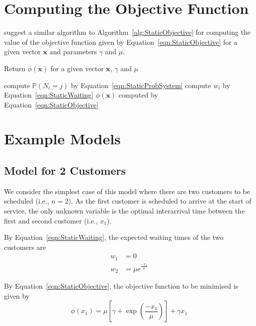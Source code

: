 \section{Computing the Objective Function}
\citet{Pegden} suggest a similar algorithm to Algorithm~\ref{alg:StaticObjective} for computing the value of the objective function given by Equation~\ref{eqn:StaticObjective} for a given vector $\mathbf{x}$ and parameters $\gamma$ and $\mu$.
\begin{algorithm}[htb]
\caption{Return $\phi (\mathbf{x})$ for a given vector $\mathbf{x}$, $\gamma$ and $\mu$}
\begin{algorithmic}
    		\State compute $\mathbb{P} (N_{i} = j)$ by Equation~\ref{eqn:StaticProbSystem}
    	\EndFor
    \EndFor
    	\State compute $w_{i}$ by Equation~\ref{eqn:StaticWaiting}
    \EndFor
    \State \Return $\phi (\mathbf{x})$ computed by Equation~\ref{eqn:StaticObjective}
\EndFunction
\end{algorithmic}
\label{alg:StaticObjective}
\end{algorithm}

\section{Example Models}
\subsection{Model for 2 Customers}
\label{sec:StaticTwoCust}
We consider the simplest case of this model where there are two customers to be scheduled (i.e., $n = 2$). As the first customer is scheduled to arrive at the start of service, the only unknown variable is the optimal interarrival time between the first and second customer (i.e., $x_{1}$).

By Equation~\ref{eqn:StaticWaiting}, the expected waiting times of the two customers are
\begin{equation}
	\begin{split}
		w_{1} & = 0 \\
		w_{2} & = \mu \mathrm{e}^{\frac{- x_{1}}{\mu}}
	\end{split}
\end{equation}

By Equation~\ref{eqn:StaticObjective}, the objective function to be minimised is given by
\begin{equation}
	\phi (x_{1}) = \mu \left[ \gamma + \exp \left( \frac{- x_{1}}{\mu} \right) \right] + \gamma x_{1}
\end{equation}

